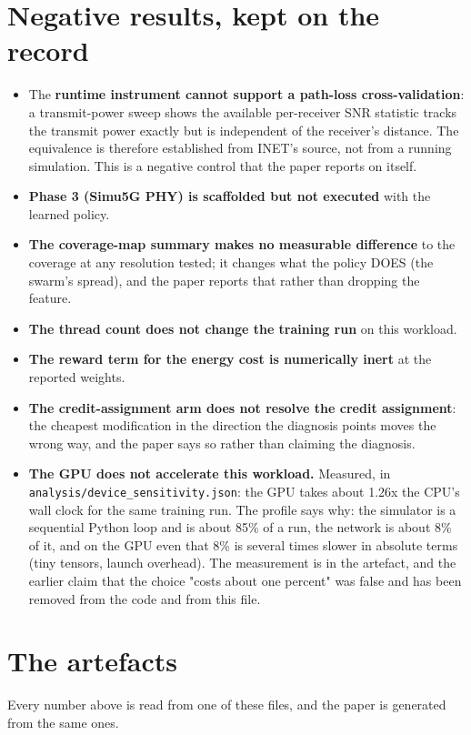 \documentclass[11pt,a4paper]{article}
\begin{document}
\begin{itemize}[leftmargin=1.15em,itemsep=4pt,topsep=2pt,label={\color{uavblue}\scriptsize\textbullet}]
\end{itemize}

\section{Negative results, kept on the record}
\begin{itemize}[leftmargin=1.15em,itemsep=4pt,topsep=2pt,label={\color{uavblue}\scriptsize\textbullet}]
\item The \textbf{runtime instrument cannot support a path-loss cross-validation}: a transmit-power sweep shows the available per-receiver SNR statistic tracks the transmit power exactly but is independent of the receiver's distance. The equivalence is therefore established from INET's source, not from a running simulation. This is a negative control that the paper reports on itself.
\item \textbf{Phase 3 (Simu5G PHY) is scaffolded but not executed} with the learned policy.
\item \textbf{The coverage-map summary makes no measurable difference} to the coverage at any resolution tested; it changes what the policy DOES (the swarm's spread), and the paper reports that rather than dropping the feature.
\item \textbf{The thread count does not change the training run} on this workload.
\item \textbf{The reward term for the energy cost is numerically inert} at the reported weights.
\item \textbf{The credit-assignment arm does not resolve the credit assignment}: the cheapest modification in the direction the diagnosis points moves the wrong way, and the paper says so rather than claiming the diagnosis.
\item \textbf{The GPU does not accelerate this workload.} Measured, in \texttt{analysis/\allowbreak{}device\_sensitivity.json}: the GPU takes about 1.26x the CPU's wall clock for the same training run. The profile says why: the simulator is a sequential Python loop and is about 85\% of a run, the network is about 8\% of it, and on the GPU even that 8\% is several times slower in absolute terms (tiny tensors, launch overhead). The measurement is in the artefact, and the earlier claim that the choice "costs about one percent" was false and has been removed from the code and from this file.
\end{itemize}

\section{The artefacts}
Every number above is read from one of these files, and the paper is generated from the same ones.
\end{document}
